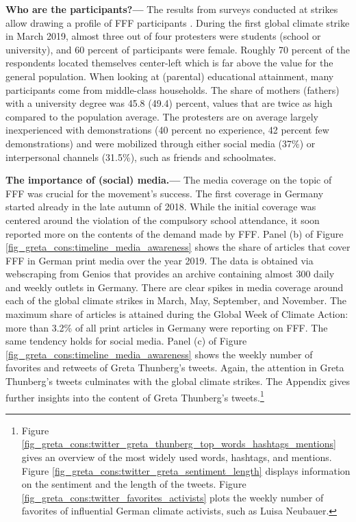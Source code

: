  \textbf{Who are the participants?---} The results from surveys conducted at strikes allow drawing a profile of FFF participants \citep{sommer2019fridays,demoor2020protest}. During the first global climate strike in March 2019, almost three out of four protesters were students (school or university), and 60 percent of participants were female. Roughly 70 percent of the respondents located themselves center-left which is far above the value for the general population. When looking at (parental) educational attainment, many participants come from middle-class households. The share of mothers (fathers) with a university degree was 45.8 (49.4) percent, values that are twice as high compared to the population average. The protesters are on average largely inexperienced with demonstrations (40 percent no experience, 42 percent few demonstrations) and were mobilized through either social media (37\%) or interpersonal channels (31.5\%), such as friends and schoolmates.

 
 
 
 \textbf{The importance of (social) media.---} The media coverage on the topic of FFF was crucial for the movement's success. The first coverage in Germany started already in the late autumn of 2018.
 While the initial coverage was centered around the violation of the compulsory school attendance, it soon reported more on the contents of the demand made by FFF. Panel (b) of Figure \ref{fig_greta_cons:timeline_media_awareness} shows the share of articles that cover FFF in German print media over the year 2019. The data is obtained via webscraping from Genios that provides an archive containing almost 300 daily and weekly outlets in Germany. There are clear spikes in media coverage around each of the global climate strikes in March, May, September, and November. The maximum share of articles is attained during the Global Week of Climate Action: more than 3.2\% of all print articles in Germany were reporting on FFF. The same tendency holds for social media. Panel (c) of Figure \ref{fig_greta_cons:timeline_media_awareness} shows the weekly number of favorites and retweets of Greta Thunberg's tweets. Again, the attention in Greta Thunberg's tweets culminates with the global climate strikes. The Appendix gives further insights into the content of Greta Thunberg's tweets.\footnote{Figure \ref{fig_greta_cons:twitter_greta_thunberg_top_words_hashtags_mentions} gives an overview of the most widely used words, hashtags, and mentions. Figure \ref{fig_greta_cons:twitter_greta_sentiment_length} displays information on the sentiment and the length of the tweets. Figure \ref{fig_greta_cons:twitter_favorites_activists} plots the weekly number of favorites of influential German climate activists, such as Luisa Neubauer.}



